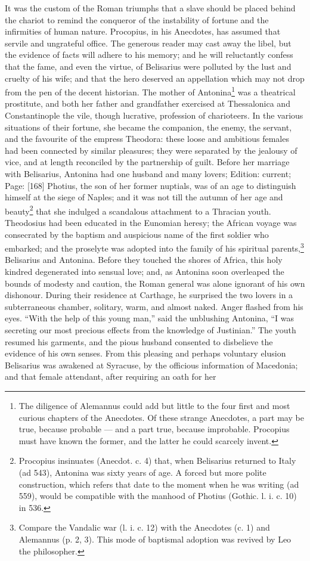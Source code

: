 It was the custom of the Roman triumphs that a slave should be placed behind the chariot to remind the conqueror of the instability of fortune and the infirmities of human nature. Procopius, in his Anecdotes, has assumed that servile and ungrateful office. The generous reader may cast away the libel, but the evidence of facts will adhere to his memory; and he will reluctantly confess that the fame, and even the virtue, of Belisarius were polluted by the lust and cruelty of his wife; and that the hero deserved an appellation which may not drop from the pen of the decent historian. The mother of Antonina\footnote{The diligence of Alemannus could add but little to the four first and most curious chapters of the Anecdotes. Of these strange Anecdotes, a part may be true, because probable \texthebrew{—} and a part true, because improbable. Procopius must have known the former, and the latter he could scarcely invent.} was a theatrical prostitute, and both her father and grandfather exercised at Thessalonica and Constantinople the vile, though lucrative, profession of charioteers. In the various situations of their fortune, she became the companion, the enemy, the servant, and the favourite of the empress Theodora: these loose and ambitious females had been connected by similar pleasures; they were separated by the jealousy of vice, and at length reconciled by the partnership of guilt. Before her marriage with Belisarius, Antonina had one husband and many lovers; Edition: current; Page: [168] Photius, the son of her former nuptials, was of an age to distinguish himself at the siege of Naples; and it was not till the autumn of her age and beauty\footnote{Procopius insinuates (Anecdot. c. 4) that, when Belisarius returned to Italy (ad 543), Antonina was sixty years of age. A forced but more polite construction, which refers that date to the moment when he was writing (ad 559), would be compatible with the manhood of Photius (Gothic. l. i. c. 10) in 536.} that she indulged a scandalous attachment to a Thracian youth. Theodosius had been educated in the Eunomian heresy; the African voyage was consecrated by the baptism and auspicious name of the first soldier who embarked; and the proselyte was adopted into the family of his spiritual parents,\footnote{Compare the Vandalic war (l. i. c. 12) with the Anecdotes (c. 1) and Alemannus (p. 2, 3). This mode of baptismal adoption was revived by Leo the philosopher.} Belisarius and Antonina. Before they touched the shores of Africa, this holy kindred degenerated into sensual love; and, as Antonina soon overleaped the bounds of modesty and caution, the Roman general was alone ignorant of his own dishonour. During their residence at Carthage, he surprised the two lovers in a subterraneous chamber, solitary, warm, and almost naked. Anger flashed from his eyes. \texthebrew{“}With the help of this young man,\texthebrew{}” said the unblushing Antonina, \texthebrew{“}I was secreting our most precious effects from the knowledge of Justinian.\texthebrew{}” The youth resumed his garments, and the pious husband consented to disbelieve the evidence of his own senses. From this pleasing and perhaps voluntary elusion Belisarius was awakened at Syracuse, by the officious information of Macedonia; and that female attendant, after requiring an oath for her 